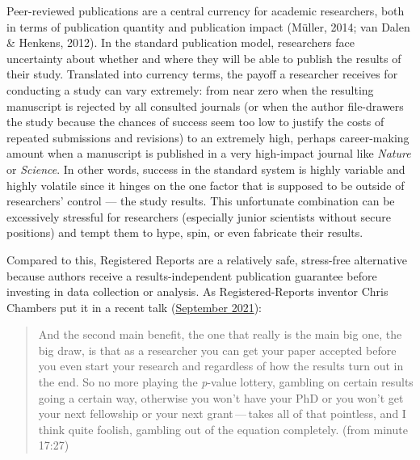 \documentclass[british,,doc,mask,floatsintext]{apa6}
\begin{document}
Peer-reviewed publications are a central currency for academic researchers, both in terms of publication quantity and publication impact (Müller, 2014; van Dalen \& Henkens, 2012).
In the standard publication model, researchers face uncertainty about whether and where they will be able to publish the results of their study. Translated into currency terms, the payoff a researcher receives for conducting a study can vary extremely:
from near zero when the resulting manuscript is rejected by all consulted journals (or when the author file-drawers the study because the chances of success seem too low to justify the costs of repeated submissions and revisions) to an extremely high, perhaps career-making amount when a manuscript is published in a very high-impact journal like \emph{Nature} or \emph{Science}.
In other words, success in the standard system is highly variable and highly volatile since it hinges on the one factor that is supposed to be outside of researchers' control --- the study results.
This unfortunate combination can be excessively stressful for researchers (especially junior scientists without secure positions) and tempt them to hype, spin, or even fabricate their results.

Compared to this, Registered Reports are a relatively safe, stress-free alternative because authors receive a results-independent publication guarantee before investing in data collection or analysis.
As Registered-Reports inventor Chris Chambers put it in a recent talk (\href{https://youtu.be/FiVI3cwVMZI?list=PLChfyH8TVDGmYENpXUDPaeeq2SLh8q9dt\&t=1047}{September 2021}):

\begin{quote}
And the second main benefit, the one that really is the main big one, the big draw, is that as a researcher you can get your paper accepted before you even start your research and regardless of how the results turn out in the end. So no more playing the \emph{p}-value lottery, gambling on certain results going a certain way, otherwise you won't have your PhD or you won't get your next fellowship or your next grant\(\,\)---\(\,\)takes all of that pointless, and I think quite foolish, gambling out of the equation completely. (from minute 17:27)
\end{quote}
\end{document}
